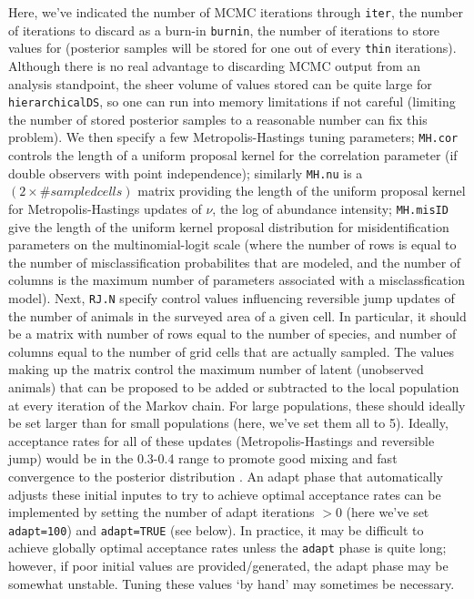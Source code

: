 \documentclass{article}\usepackage{graphicx, color}
\begin{document}
Here, we've indicated the number of MCMC iterations through \texttt{iter}, the number of iterations to discard as a burn-in \texttt{burnin}, the number of iterations to store values for (posterior samples will be stored for one out of every \texttt{thin} iterations).  Although there is no real advantage to discarding MCMC output from an analysis standpoint, the sheer volume of values stored can be quite large for \texttt{hierarchicalDS}, so one can run into memory limitations if not careful (limiting the number of stored posterior samples to a reasonable number can fix this problem).  We then specify a few Metropolis-Hastings tuning parameters; \texttt{MH.cor} controls the length of a uniform proposal kernel for the correlation parameter (if double observers with point independence); similarly \texttt{MH.nu} is a $(2 \times \# sampled cells)$ matrix providing the length of the uniform proposal kernel for Metropolis-Hastings updates of $\nu$, the log of abundance intensity; \texttt{MH.misID} give the length of the uniform kernel proposal distribution for misidentification parameters on the multinomial-logit scale (where the number of rows is equal to the number of misclassification probabilites that are modeled, and the number of columns is the maximum number of parameters associated with a misclassfication model).  Next, \texttt{RJ.N} specify control values influencing reversible jump updates of the number of animals in the surveyed area of a given cell.  In particular, it should be a matrix with number of rows equal to the number of species, and number of columns equal to the number of grid cells that are actually sampled.  The values making up the matrix control the maximum number of latent (unobserved animals) that can be proposed to be added or subtracted to the local population at every iteration of the Markov chain.  For large populations, these should ideally be set larger than for small populations (here, we've set them all to 5). Ideally, acceptance rates for all of these updates (Metropolis-Hastings and reversible jump) would be in the 0.3-0.4 range to promote good mixing and fast convergence to the posterior distribution \citep{GelmanEtAl2004}.  An adapt phase that automatically adjusts these initial inputes to try to achieve optimal acceptance rates can be implemented by setting the number of adapt iterations $>0$ (here we've set \texttt{adapt=100}) and \texttt{adapt=TRUE} (see below).  In practice, it may be difficult to achieve globally optimal acceptance rates unless the \texttt{adapt} phase is quite long; however, if poor initial values are provided/generated, the adapt phase may be somewhat unstable.  Tuning these values `by hand' may sometimes be necessary.
\end{document}
